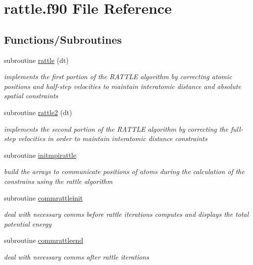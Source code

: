 \hypertarget{rattle_8f90}{\section{rattle.\-f90 File Reference}
\label{rattle_8f90}
}
\subsection*{Functions/\-Subroutines}
\begin{DoxyCompactItemize}
\item 
subroutine \hyperlink{rattle_8f90_a9f934b1ddf0ac5516efd2a23be73722c}{rattle} (dt)
\begin{DoxyCompactList}\small\item\em implements the first portion of the R\-A\-T\-T\-L\-E algorithm by correcting atomic positions and half-\/step velocities to maintain interatomic distance and absolute spatial constraints \end{DoxyCompactList}\item 
subroutine \hyperlink{rattle_8f90_aff356ce357db8823af8ee87f905e53ec}{rattle2} (dt)
\begin{DoxyCompactList}\small\item\em implements the second portion of the R\-A\-T\-T\-L\-E algorithm by correcting the full-\/step velocities in order to maintain interatomic distance constraints \end{DoxyCompactList}\item 
subroutine \hyperlink{rattle_8f90_a9c4ba35c7fb23f7c96eca2b3f8cf447d}{initmpirattle}
\begin{DoxyCompactList}\small\item\em build the arrays to communicate positions of atoms during the calculation of the constrains using the rattle algorithm \end{DoxyCompactList}\item 
subroutine \hyperlink{rattle_8f90_a05f49af301e0b95ac6ef7d9565e0d66f}{commrattleinit}
\begin{DoxyCompactList}\small\item\em deal with necessary comms before rattle iterations computes and displays the total potential energy \end{DoxyCompactList}\item 
subroutine \hyperlink{rattle_8f90_a139ff37e3a4d7bad93ea575ba3b16d16}{commrattleend}
\begin{DoxyCompactList}\small\item\em deal with necessary comms after rattle iterations \end{DoxyCompactList}\item 

\end{DoxyCompactItemize}
